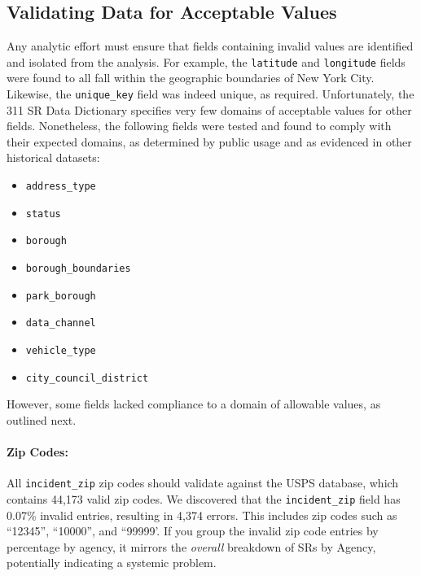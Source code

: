 \documentclass[linenumber]{jdsart}
\begin{document}
\subsection{Validating Data for Acceptable Values}
\label{sec:domain}
Any analytic effort must ensure that fields containing invalid values 
are identified and isolated from the analysis. For example, the \texttt{latitude} 
and \texttt{longitude} fields were found to all fall within the 
geographic boundaries of New York City. Likewise, 
the \texttt{unique\_key} field was indeed unique, as required. 
Unfortunately, the 311 SR Data Dictionary specifies very few domains
of acceptable values for other fields. Nonetheless, the following
fields were tested and found to comply with their expected
domains, as determined by public
usage and as evidenced in other historical datasets:
\begin{itemize}[left=1.5em]
    \item \texttt{address\_type}
    \item \texttt{status}
    \item \texttt{borough}
    \item \texttt{borough\_boundaries}
    \item \texttt{park\_borough}
    \item \texttt{data\_channel}
    \item \texttt{vehicle\_type}
    \item \texttt{city\_council\_district}
\end{itemize}
However, some fields lacked compliance
to a domain of allowable values, as outlined next.

\paragraph{Zip Codes:}
\label{sec:zipcodesissues}
All \texttt{incident\_zip} zip codes should 
validate against the USPS database, which contains 
44,173 valid zip codes. We discovered that the \texttt{incident\_zip} 
field has 0.07\% invalid entries, resulting in 4,374 errors. This includes
zip codes such as ``12345'', ``10000'', and ``99999'. If you group 
the invalid zip code entries by percentage by agency, it 
mirrors the \textit{overall} breakdown of SRs by Agency, potentially 
indicating a systemic problem.
\end{document}
